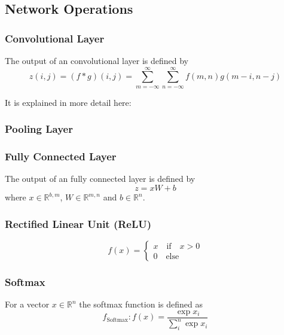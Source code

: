 \subsection{Network Operations}

\subsubsection*{Convolutional Layer}

The output of an convolutional layer is defined by
\begin{equation}
   z(i,j) = (f*g)(i,j) = \sum_{m=-\infty}^{\infty} \sum_{n=-\infty}^{\infty} f(m,n) g(m-i,n-j)
\end{equation}

It is explained in more detail here: \cite{dumoulin2016guide}

\subsubsection*{Pooling Layer}



\subsubsection*{Fully Connected Layer}

The output of an fully connected layer is defined by
\begin{equation}
	z = xW + b
\end{equation}
where $x \in \mathbb{R}^{b,m}$,  $W \in \mathbb{R}^{m,n}$ and $b \in \mathbb{R}^{n}$. 

\subsubsection*{Rectified Linear Unit (ReLU)}

\begin{equation}
	f(x) = \begin{cases}
		x \quad \text{if} \quad x > 0 \\
		0 \quad \text{else}
	\end{cases}
\end{equation}


\subsubsection*{Softmax}

For a vector $x \in \mathbb{R}^{n}$ the softmax function is defined as
\begin{equation}
	f_{\text{Softmax}}: f(x) = \frac{\exp{x_i}}{\sum_i^n \exp{x_i}}
\end{equation}
